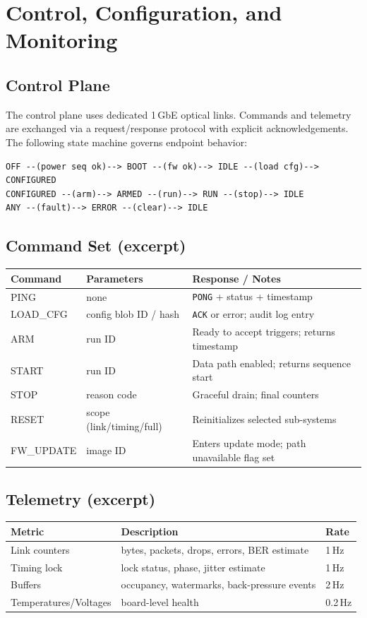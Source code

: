 
\section{Control, Configuration, and Monitoring}
\label{sec:ccm}

\subsection{Control Plane}
The control plane uses dedicated 1\,GbE optical links. Commands and telemetry are exchanged via a request/response
protocol with explicit acknowledgements. The following state machine governs endpoint behavior:

\begin{verbatim}
OFF --(power seq ok)--> BOOT --(fw ok)--> IDLE --(load cfg)--> CONFIGURED
CONFIGURED --(arm)--> ARMED --(run)--> RUN --(stop)--> IDLE
ANY --(fault)--> ERROR --(clear)--> IDLE
\end{verbatim}

\subsection{Command Set (excerpt)}
\begin{longtable}{@{}p{3.1cm}p{6.5cm}p{5.6cm}@{}}
\toprule
\textbf{Command} & \textbf{Parameters} & \textbf{Response / Notes} \\\midrule
PING & none & \texttt{PONG} + status + timestamp \\
LOAD\_CFG & config blob ID / hash & \texttt{ACK} or error; audit log entry \\
ARM & run ID & Ready to accept triggers; returns timestamp \\
START & run ID & Data path enabled; returns sequence start \\
STOP & reason code & Graceful drain; final counters \\
RESET & scope (link/timing/full) & Reinitializes selected sub-systems \\
FW\_UPDATE & image ID & Enters update mode; path unavailable flag set \\
\bottomrule
\end{longtable}

\subsection{Telemetry (excerpt)}
\begin{longtable}{@{}p{4.2cm}p{7.8cm}p{2.2cm}@{}}
\toprule
\textbf{Metric} & \textbf{Description} & \textbf{Rate} \\\midrule
Link counters & bytes, packets, drops, errors, BER estimate & 1\,Hz \\
Timing lock & lock status, phase, jitter estimate & 1\,Hz \\
Buffers & occupancy, watermarks, back-pressure events & 2\,Hz \\
Temperatures/Voltages & board-level health & 0.2\,Hz \\
\bottomrule
\end{longtable}
